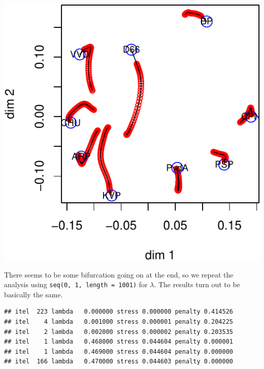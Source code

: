 \documentclass[
  12pt,
]{article}
\begin{document}
\begin{center}\includegraphics{penalty_files/figure-latex/poldist_run-1} \end{center}

There seems to be some bifurcation going on at the end, so we repeat the
analysis using \texttt{seq(0,\ 1,\ length\ =\ 1001)} for \(\lambda\).
The results turn out to be basically the same.

\begin{verbatim}
## itel  223 lambda   0.000000 stress 0.000000 penalty 0.414526 
## itel    4 lambda   0.001000 stress 0.000001 penalty 0.204225 
## itel    2 lambda   0.002000 stress 0.000002 penalty 0.203535 
## itel    1 lambda   0.468000 stress 0.044604 penalty 0.000001 
## itel    1 lambda   0.469000 stress 0.044604 penalty 0.000000 
## itel  166 lambda   0.470000 stress 0.044603 penalty 0.000000
\end{verbatim}
\end{document}
